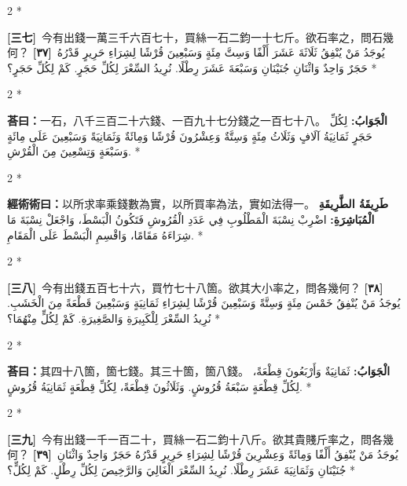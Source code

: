 \documentclass[11pt,a4paper]{article}
\newcommand{\ar}[1]{\arabicfont\beginR #1\endR}
\newcommand{\problemnum}[1]{\textbf{[\ignorespaces#1\unskip]}}
\newenvironment{bilingual}{%
  \begin{paracol}{2}%
  \switchcolumn[0]*%
}{%
  \end{paracol}%
}
\newcommand{\cnline}[1]{\switchcolumn[0]\noindent #1 \switchcolumn[1]}
\newcommand{\arline}[1]{\noindent\ar{#1} \switchcolumn[0]*}
\newenvironment{prob bilingual}{%
  \begin{paracol}{2}%
  \switchcolumn[0]*%
}{%
  \end{paracol}%
  \vspace{0.3em}%
}
\begin{document}
\begin{bilingual}
\cnline{\problemnum{三七}\, 今有出錢一萬三千六百七十，買絲一石二鈞一十七斤。欲石率之，問石幾何？}
\arline{\problemnum{٣٧}\, يُوجَدُ مَنْ يُنْفِقُ ثَلَاثَةَ عَشَرَ أَلْفًا وَسِتَّ مِئَةٍ وَسَبْعِينَ قُرْشًا لِشِرَاءِ حَرِيرٍ قَدْرُهُ حَجَرٌ وَاحِدٌ وَاثْنَانِ جُنَيْنَانِ وَسَبْعَةَ عَشَرَ رِطْلًا. نُرِيدُ السِّعْرَ لِكُلِّ حَجَرٍ. كَمْ لِكُلِّ حَجَرٍ؟}
\end{bilingual}

\begin{bilingual}
\cnline{\textcolor{answercolor}{\textbf{荅曰：}}一石，八千三百二十六錢、一百九十七分錢之一百七十八。}
\arline{\textcolor{answercolor}{\textbf{الْجَوَابُ:}} لِكُلِّ حَجَرٍ ثَمَانِيَةُ آلَافٍ وَثَلَاثُ مِئَةٍ وَسِتَّةٌ وَعِشْرُونَ قُرْشًا وَمِائَةٌ وَثَمَانِيَةً وَسَبْعِينَ عَلَى مِائَةٍ وَسَبْعَةٍ وَتِسْعِينَ مِنَ الْقُرْشِ.}
\end{bilingual}

\begin{bilingual}
\cnline{%
\textcolor{methodcolor}{\textbf{經術術曰：}}以所求率乘錢數為實，以所買率為法，實如法得一。
}
\arline{%
\textcolor{methodcolor}{\textbf{طَرِيقَةُ الطَّرِيقَةِ الْمُبَاشِرَةِ:}} اضْرِبْ نِسْبَةَ الْمَطْلُوبِ فِي عَدَدِ الْقُرُوشِ فَتَكُونُ الْبَسْطَ، وَاجْعَلْ نِسْبَةَ مَا شِرَاءَهُ مَقَامًا، وَاقْسِمِ الْبَسْطَ عَلَى الْمَقَامِ.
}
\end{bilingual}

\begin{bilingual}
\cnline{\problemnum{三八}\, 今有出錢五百七十六，買竹七十八箇。欲其大小率之，問各幾何？}
\arline{\problemnum{٣٨}\, يُوجَدُ مَنْ يُنْفِقُ خَمْسَ مِئَةٍ وَسِتَّةً وَسَبْعِينَ قُرْشًا لِشِرَاءِ ثَمَانِيَةٍ وَسَبْعِينَ قَطْعَةً مِنَ الْخَشَبِ. نُرِيدُ السِّعْرَ لِلْكَبِيرَةِ وَالصَّغِيرَةِ. كَمْ لِكُلٍّ مِنْهُمَا؟}
\end{bilingual}

\begin{bilingual}
\cnline{\textcolor{answercolor}{\textbf{荅曰：}}其四十八箇，箇七錢。其三十箇，箇八錢。}
\arline{\textcolor{answercolor}{\textbf{الْجَوَابُ:}} ثَمَانِيَةٌ وَأَرْبَعُونَ قِطْعَةً، لِكُلِّ قِطْعَةٍ سَبْعَةُ قُرُوشٍ. وَثَلَاثُونَ قِطْعَةً، لِكُلِّ قِطْعَةٍ ثَمَانِيَةُ قُرُوشٍ.}
\end{bilingual}

\begin{bilingual}
\cnline{\problemnum{三九}\, 今有出錢一千一百二十，買絲一石二鈞十八斤。欲其貴賤斤率之，問各幾何？}
\arline{\problemnum{٣٩}\, يُوجَدُ مَنْ يُنْفِقُ أَلْفًا وَمِائَةً وَعِشْرِينَ قُرْشًا لِشِرَاءِ حَرِيرٍ قَدْرُهُ حَجَرٌ وَاحِدٌ وَاثْنَانِ جُنَيْنَانِ وَثَمَانِيَةَ عَشَرَ رِطْلًا. نُرِيدُ السِّعْرَ الْغَالِيَ وَالرَّخِيصَ لِكُلِّ رِطْلٍ. كَمْ لِكُلٍّ؟}
\end{bilingual}
\end{document}
